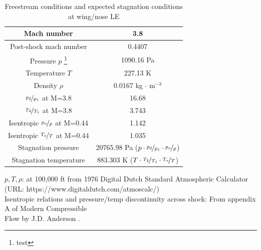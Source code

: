 
\begin{table}[H]
\centering
	\caption{Freestream conditions and expected stagnation conditions at wing/nose LE}
	\begin{tabular}{|c|c|} \hline
	Mach number           & 3.8 \\ \hline
	Post-shock mach number & 0.4407 \\ \hline
	Pressure $p$ \footnote{test}	& 1090.16 Pa \\ \hline
	Temperature $T$ 	& 227.13 K	\\ \hline
	Density $\rho$ 	& 0.0167 kg $\cdot$ m$^{-3}$ \\ \hline
	$\nicefrac{p_2}{p_1}$ at M=3.8 & 16.68 \\ \hline
	$\nicefrac{T_2}{T_1}$ at M=3.8 & 3.743 \\ \hline
	Isentropic $\nicefrac{p_o}{p}$ at M=0.44 & 1.142 \\ \hline
	Isentropic $\nicefrac{T_o}{T}$ at M=0.44 & 1.035 \\ \hline
	Stagnation pressure		& 20765.98 Pa ($p \cdot \nicefrac{p_2}{p_1} \cdot \nicefrac{p_o}{p}$) \\ \hline
	Stagnation temperature	& 883.303 K ($T \cdot \nicefrac{T_2}{T_1} \cdot \nicefrac{T_o}{T}$) \\ \hline
	\end{tabular}
\end{table}
\noindent$p, T, \rho$: at 100,000 ft from 1976 Digital Dutch Standard Atmospheric Calculator \\ \indent (URL: https://www.digitaldutch.com/atmoscalc/) \\
\noindent Isentropic relations and pressure/temp discontinuity across shock: From appendix A of Modern Compressible \\ \indent Flow by J.D. Anderson \cite{anderson_comp_flow}.
